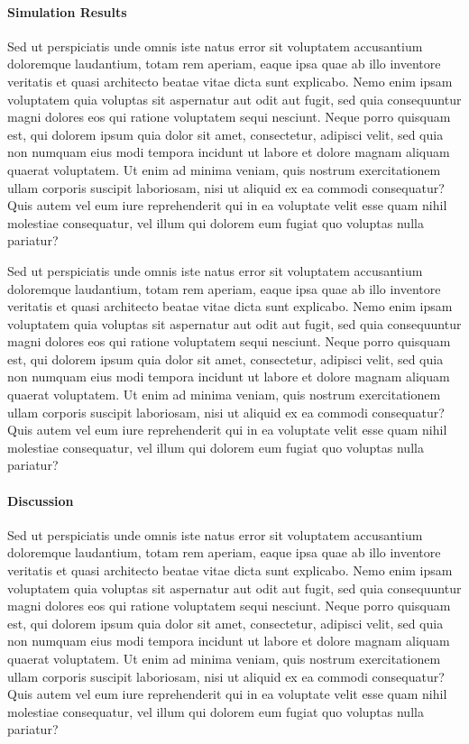 \documentclass[12pt]{article}
\begin{document}
\paragraph*{Simulation Results}

Sed ut perspiciatis unde omnis iste natus error sit voluptatem
accusantium doloremque laudantium, totam rem aperiam, eaque ipsa quae
ab illo inventore veritatis et quasi architecto beatae vitae dicta
sunt explicabo. Nemo enim ipsam voluptatem quia voluptas sit
aspernatur aut odit aut fugit, sed quia consequuntur magni dolores eos
qui ratione voluptatem sequi nesciunt. Neque porro quisquam est, qui
dolorem ipsum quia dolor sit amet, consectetur, adipisci velit, sed
quia non numquam eius modi tempora incidunt ut labore et dolore magnam
aliquam quaerat voluptatem. Ut enim ad minima veniam, quis nostrum
exercitationem ullam corporis suscipit laboriosam, nisi ut aliquid ex
ea commodi consequatur? Quis autem vel eum iure reprehenderit qui in
ea voluptate velit esse quam nihil molestiae consequatur, vel illum
qui dolorem eum fugiat quo voluptas nulla pariatur?

Sed ut perspiciatis unde omnis iste natus error sit voluptatem
accusantium doloremque laudantium, totam rem aperiam, eaque ipsa quae
ab illo inventore veritatis et quasi architecto beatae vitae dicta
sunt explicabo. Nemo enim ipsam voluptatem quia voluptas sit
aspernatur aut odit aut fugit, sed quia consequuntur magni dolores eos
qui ratione voluptatem sequi nesciunt. Neque porro quisquam est, qui
dolorem ipsum quia dolor sit amet, consectetur, adipisci velit, sed
quia non numquam eius modi tempora incidunt ut labore et dolore magnam
aliquam quaerat voluptatem. Ut enim ad minima veniam, quis nostrum
exercitationem ullam corporis suscipit laboriosam, nisi ut aliquid ex
ea commodi consequatur? Quis autem vel eum iure reprehenderit qui in
ea voluptate velit esse quam nihil molestiae consequatur, vel illum
qui dolorem eum fugiat quo voluptas nulla pariatur?

\paragraph*{Discussion}

Sed ut perspiciatis unde omnis iste natus error sit voluptatem
accusantium doloremque laudantium, totam rem aperiam, eaque ipsa quae
ab illo inventore veritatis et quasi architecto beatae vitae dicta
sunt explicabo. Nemo enim ipsam voluptatem quia voluptas sit
aspernatur aut odit aut fugit, sed quia consequuntur magni dolores eos
qui ratione voluptatem sequi nesciunt. Neque porro quisquam est, qui
dolorem ipsum quia dolor sit amet, consectetur, adipisci velit, sed
quia non numquam eius modi tempora incidunt ut labore et dolore magnam
aliquam quaerat voluptatem. Ut enim ad minima veniam, quis nostrum
exercitationem ullam corporis suscipit laboriosam, nisi ut aliquid ex
ea commodi consequatur? Quis autem vel eum iure reprehenderit qui in
ea voluptate velit esse quam nihil molestiae consequatur, vel illum
qui dolorem eum fugiat quo voluptas nulla pariatur?
\end{document}

